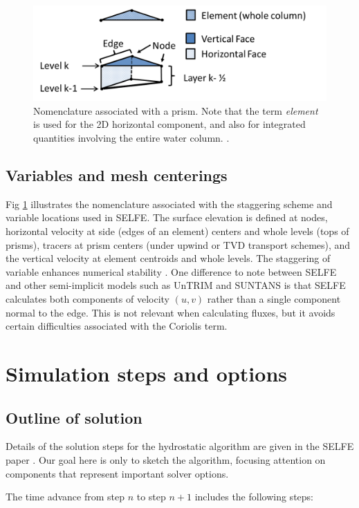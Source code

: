 \begin{figure}
	\centering
		\includegraphics[scale=1.0]{image/prism}
	\caption{Nomenclature associated with a prism. Note that the term {\em element} is used for 
	the 2D horizontal component, and also for integrated quantities involving the entire water column. 
	.}
	\label{fig:prism}
\end{figure}


\subsection{Variables and mesh centerings}
Fig \ref{fig:prism} illustrates the nomenclature associated with the staggering scheme and variable locations used in SELFE. 
The surface elevation is defined at nodes, horizontal velocity at side (edges of an element) centers and whole levels (tops of prisms), tracers at prism centers (under upwind
or TVD transport schemes), and the vertical velocity at element centroids and whole levels. The staggering of variable enhances numerical stability \citep{Danilov13}. One difference to note between SELFE and other semi-implicit models
such as UnTRIM and SUNTANS is that SELFE calculates both components of velocity $(u,v)$ rather than a single
component normal to the edge. This is not relevant when calculating fluxes, but it avoids certain difficulties associated
with the Coriolis term. 

\section{Simulation steps and options}
\subsection{Outline of solution}
Details of the solution steps for the hydrostatic algorithm are given in the SELFE paper \citep{Zhang08}. 
Our goal here is only to sketch the algorithm, focusing attention on components that represent important
solver options. 

The time advance from step $n$ to step $n+1$ includes the following steps:

